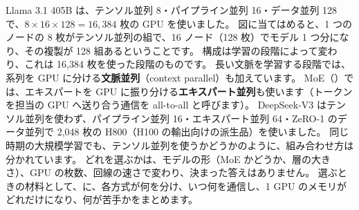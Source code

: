 Llama 3.1 405B は、テンソル並列 8・パイプライン並列 16・データ並列 128 で、$8\times16\times128=16{,}384$ 枚の GPU を使いました\cite{dubey2024llama3}。
図に当てはめると、1 つのノードの 8 枚がテンソル並列の組で、16 ノード（128 枚）でモデル 1 つ分になり、その複製が 128 組あるということです。
構成は学習の段階によって変わり、これは 16,384 枚を使った段階のものです。
長い文脈を学習する段階では、系列を GPU に分ける\textbf{文脈並列}（context parallel）も加えています。
MoE（）では、エキスパートを GPU に振り分ける\textbf{エキスパート並列}も使います（トークンを担当の GPU へ送り合う通信を all-to-all と呼びます）。
DeepSeek-V3 はテンソル並列を使わず、パイプライン並列 16・エキスパート並列 64・ZeRO-1 のデータ並列で 2,048 枚の H800（H100 の輸出向けの派生品）を使いました\cite{liu2024deepseekv3}。
同じ時期の大規模学習でも、テンソル並列を使うかどうかのように、組み合わせ方は分かれています。
どれを選ぶかは、モデルの形（MoE かどうか、層の大きさ）、GPU の枚数、回線の速さで変わり、決まった答えはありません。
選ぶときの材料として、に、各方式が何を分け、いつ何を通信し、1 GPU のメモリがどれだけになり、何が苦手かをまとめます。

